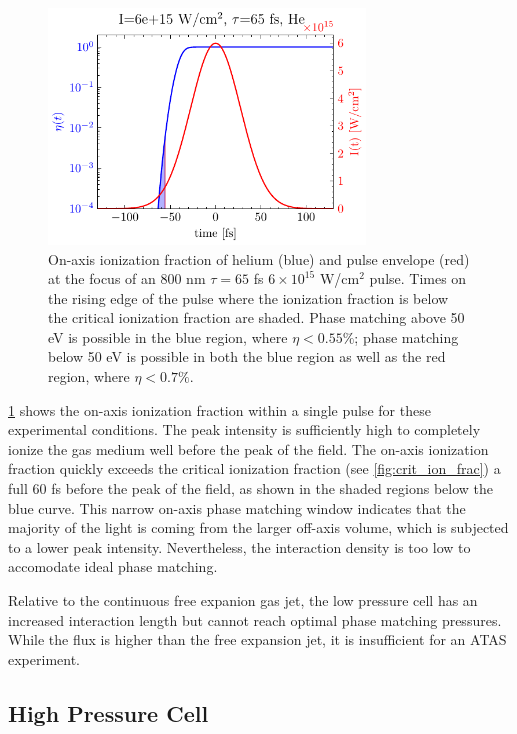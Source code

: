 \begin{figure}
	\centering
	\includegraphics[width=0.75\textwidth]{figures/chap3/eta_vs_t_He800_6e15Wcm2.pdf}
	\caption{On-axis ionization fraction of helium (blue) and pulse envelope (red) at the focus of an 800 nm $\tau = 65$ fs $6 \times 10^{15}$ W/cm$^2$ pulse. Times on the rising edge of the pulse where the ionization fraction is below the critical ionization fraction are shaded. Phase matching above 50 eV is possible in the blue region, where $\eta < 0.55\%$; phase matching below 50 eV is possible in both the blue region as well as the red region, where $\eta < 0.7\%$.}
	\label{fig:eta_vs_t_He800_6e15Wcm2}
\end{figure}

\cref{fig:eta_vs_t_He800_6e15Wcm2} shows the on-axis ionization fraction within a single pulse for these experimental conditions. The peak intensity is sufficiently high to completely ionize the gas medium well before the peak of the field. The on-axis ionization fraction quickly exceeds the critical ionization fraction (see \cref{fig:crit_ion_frac}) a full 60 fs before the peak of the field, as shown in the shaded regions below the blue curve. This narrow on-axis phase matching window indicates that the majority of the light is coming from the larger off-axis volume, which is subjected to a lower peak intensity. Nevertheless, the interaction density is too low to accomodate ideal phase matching.

Relative to the continuous free expanion gas jet, the low pressure cell has an increased interaction length but cannot reach optimal phase matching pressures. While the flux is higher than the free expansion jet, it is insufficient for an ATAS experiment.

\subsection{High Pressure Cell}
\label{sec:HPC}

